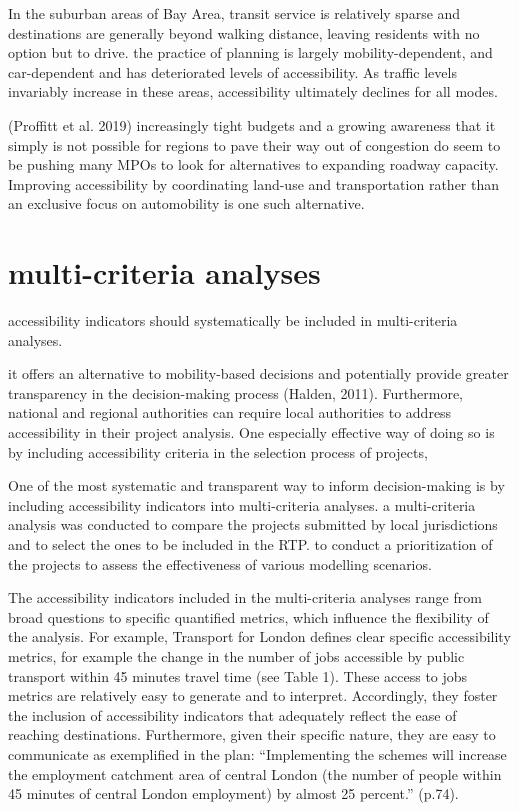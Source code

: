 \documentclass[12pt,]{article}
\begin{document}
In the suburban areas of Bay Area, transit service is relatively sparse
and destinations are generally beyond walking distance, leaving
residents with no option but to drive. the practice of planning is
largely mobility-dependent, and car-dependent and has deteriorated
levels of accessibility. As traffic levels invariably increase in these
areas, accessibility ultimately declines for all modes.

(Proffitt et al. 2019) increasingly tight budgets and a growing
awareness that it simply is not possible for regions to pave their way
out of congestion do seem to be pushing many MPOs to look for
alternatives to expanding roadway capacity. Improving accessibility by
coordinating land-use and transportation rather than an exclusive focus
on automobility is one such alternative.

\hypertarget{multi-criteria-analyses}{%
\section{multi-criteria analyses}\label{multi-criteria-analyses}}

accessibility indicators should systematically be included in
multi-criteria analyses.

it offers an alternative to mobility-based decisions and potentially
provide greater transparency in the decision-making process (Halden,
2011). Furthermore, national and regional authorities can require local
authorities to address accessibility in their project analysis. One
especially effective way of doing so is by including accessibility
criteria in the selection process of projects,

One of the most systematic and transparent way to inform decision-making
is by including accessibility indicators into multi-criteria analyses. a
multi-criteria analysis was conducted to compare the projects submitted
by local jurisdictions and to select the ones to be included in the RTP.
to conduct a prioritization of the projects to assess the effectiveness
of various modelling scenarios.

The accessibility indicators included in the multi-criteria analyses
range from broad questions to specific quantified metrics, which
influence the flexibility of the analysis. For example, Transport for
London defines clear specific accessibility metrics, for example the
change in the number of jobs accessible by public transport within 45
minutes travel time (see Table 1). These access to jobs metrics are
relatively easy to generate and to interpret. Accordingly, they foster
the inclusion of accessibility indicators that adequately reflect the
ease of reaching destinations. Furthermore, given their specific nature,
they are easy to communicate as exemplified in the plan: ``Implementing
the schemes will increase the employment catchment area of central
London (the number of people within 45 minutes of central London
employment) by almost 25 percent.'' (p.74).
\end{document}
